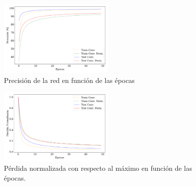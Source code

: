     \begin{figure}[H]
        \begin{small}
            \begin{center}
                \includegraphics[width=0.5\textwidth]{Graphs/ejer9_acc.pdf}
            \end{center}
            \caption{Precisión de la red en función de las épocas}
            \label{fig:ejer9_acc}
        \end{small}
    \end{figure}


    \begin{figure}[H]
        \begin{small}
            \begin{center}
                \includegraphics[width=0.5\textwidth]{Graphs/ejer9_loss.pdf}
            \end{center}
            \caption{Pérdida normalizada con respecto al máximo en función de las épocas. }
            \label{fig:ejer9_loss}
        \end{small}
    \end{figure}



